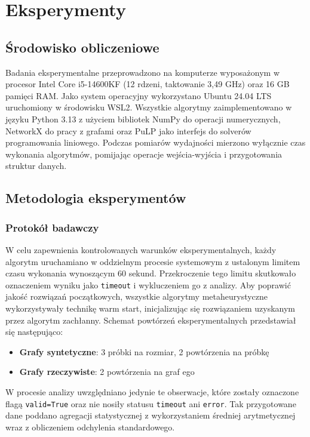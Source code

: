 \chapter{Eksperymenty}

\section{Środowisko obliczeniowe}

Badania eksperymentalne przeprowadzono na komputerze wyposażonym w procesor Intel Core i5-14600KF (12 rdzeni, taktowanie 3,49 GHz) oraz 16 GB pamięci RAM. Jako system operacyjny wykorzystano Ubuntu 24.04 LTS uruchomiony w środowisku WSL2. Wszystkie algorytmy zaimplementowano w języku Python 3.13 z użyciem bibliotek NumPy do operacji numerycznych, NetworkX do pracy z grafami oraz PuLP jako interfejs do solverów programowania liniowego. Podczas pomiarów wydajności mierzono wyłącznie czas wykonania algorytmów, pomijając operacje wejścia-wyjścia i przygotowania struktur danych.

\section{Metodologia eksperymentów}

\subsection{Protokół badawczy}

W celu zapewnienia kontrolowanych warunków eksperymentalnych, każdy algorytm uruchamiano w oddzielnym procesie systemowym z ustalonym limitem czasu wykonania wynoszącym 60 sekund. Przekroczenie tego limitu skutkowało oznaczeniem wyniku jako \texttt{timeout} i wykluczeniem go z analizy. Aby poprawić jakość rozwiązań początkowych, wszystkie algorytmy metaheurystyczne wykorzystywały technikę warm start, inicjalizując się rozwiązaniem uzyskanym przez algorytm zachłanny. Schemat powtórzeń eksperymentalnych przedstawiał się następująco:

\begin{itemize}
\item \textbf{Grafy syntetyczne}: 3 próbki na rozmiar, 2 powtórzenia na próbkę
\item \textbf{Grafy rzeczywiste}: 2 powtórzenia na graf ego
\end{itemize}

W procesie analizy uwzględniano jedynie te obserwacje, które zostały oznaczone flagą \texttt{valid=True} oraz nie nosiły statusu \texttt{timeout} ani \texttt{error}. Tak przygotowane dane poddano agregacji statystycznej z wykorzystaniem średniej arytmetycznej wraz z obliczeniem odchylenia standardowego.

